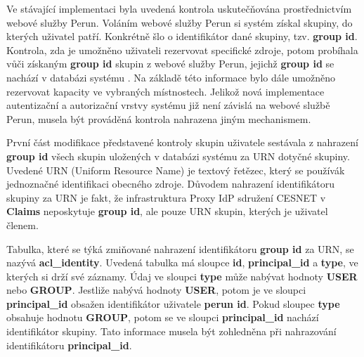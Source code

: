 \documentclass[
  printed, %
  twoside, %
  table,   %
  nolof,     %
  nolot,     %
]{fithesis3}
\begin{document}
Ve stávající implementaci byla uvedená kontrola uskutečňována prostřednictvím webové služby Perun. Voláním webové služby Perun si systém  získal skupiny, do kterých uživatel patří. Konkrétně šlo o identifikátor dané skupiny, tzv. \textbf{group id}. Kontrola, zda je umožněno uživateli rezervovat specifické zdroje, potom probíhala vůči získaným \textbf{group id} skupin z webové služby Perun, jejichž \textbf{group id} se nachází v databázi systému . Na základě této informace bylo dále umožněno rezervovat kapacity ve vybraných místnostech. Jelikož nová implementace autentizační a autorizační vrstvy systému  již není závislá na webové službě Perun, musela být prováděná kontrola nahrazena jiným mechanismem. 

\par
První část modifikace představené kontroly skupin uživatele sestávala z nahrazení \textbf{group id} všech skupin uložených v databázi systému  za URN \cite{rfc2141} dotyčné skupiny. Uvedené URN (Uniform Resource Name) je textový řetězec, který se používá\break k jednoznačné identifikaci obecného zdroje. Důvodem nahrazení identifikátoru skupiny za URN je fakt, že infrastruktura Proxy IdP sdružení CESNET v \textbf{Claims} neposkytuje \textbf{group id}, ale pouze URN skupin, kterých je uživatel členem. 

\par 

Tabulka, které se týká zmiňované nahrazení identifikátoru \textbf{group id} za URN, se nazývá \textbf{acl\_identity}. Uvedená tabulka má sloupce \textbf{id}, \textbf{principal\_id} a \textbf{type}, ve kterých si drží své záznamy. Údaj ve sloupci \textbf{type} může nabývat hodnoty \textbf{USER} nebo \textbf{GROUP}. Jestliže nabývá hodnoty \textbf{USER}, potom je ve sloupci \textbf{principal\_id} obsažen identifikátor uživatele \textbf{perun id}. Pokud sloupec \textbf{type} obsahuje hodnotu \textbf{GROUP}, potom se ve sloupci \textbf{principal\_id} nachází identifikátor skupiny. Tato informace musela být zohledněna při nahrazování identifikátoru \textbf{principal\_id}. 
\end{document}
